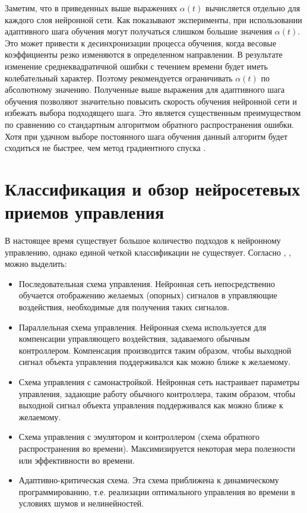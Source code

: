 Заметим, что в приведенных выше выражениях $\alpha(t)$ вычисляется отдельно для каждого слоя нейронной сети. Как показывают эксперименты, при использовании адаптивного шага обучения могут получаться слишком большие значения $\alpha(t)$. Это может привести к десинхронизации процесса обучения, когда весовые коэффициенты резко изменяются в определенном направлении. В результате изменение среднеквадратичной ошибки с течением времени будет иметь колебательный характер. Поэтому рекомендуется ограничивать $\alpha(t)$ по абсолютному значению. Полученные выше выражения для адаптивного шага обучения позволяют значительно повысить скорость обучения нейронной сети и избежать выбора подходящего шага. Это является существенным преимуществом по сравнению со стандартным алгоритмом обратного распространения ошибки. Хотя при удачном выборе постоянного шага обучения данный алгоритм будет сходиться не быстрее, чем метод градиентного спуска \cite{Golovko_2001}.

\section{Классификация и обзор нейросетевых приемов управления}

В настоящее время существует большое количество подходов к нейронному управлению, однако единой четкой классификации не существует. Согласно \cite{Omatu_Khalid_Yusof}, \cite{Notkin_2006}, \cite{White_1992} можно выделить:

\begin{itemize}
    \item Последовательная схема управления. Нейронная сеть непосредственно обучается отображению желаемых (опорных) сигналов в управляющие воздействия, необходимые для получения таких сигналов.
    \item Параллельная схема управления. Нейронная схема используется для компенсации управляющего воздействия, задаваемого обычным контроллером. Компенсация производится таким образом, чтобы выходной сигнал объекта управления поддерживался как можно ближе к желаемому.
    \item Схема управления с самонастройкой. Нейронная сеть настраивает параметры управления, задающие работу обычного контроллера, таким образом, чтобы выходной сигнал объекта управления поддерживался как можно ближе к желаемому.
    \item Схема управления с эмулятором и контроллером (схема обратного распространения во времени). Максимизируется некоторая мера полезности или эффективности во времени.
    \item Адаптивно-критическая схема. Эта схема приближена к динамическому программированию, т.е. реализации оптимального управления во времени в условиях шумов и нелинейностей.
\end{itemize}

